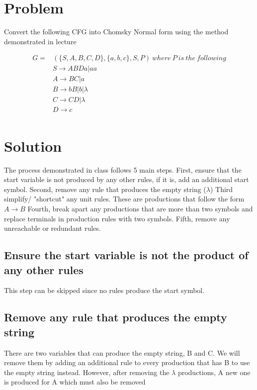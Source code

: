 \documentclass{assignment-x}
\begin{document}
\maketitle
\pagebreak

\section{Problem}
Convert the following CFG into Chomsky Normal form using the method demonstrated in lecture

\begin{align*}
    G=&(\{S,A,B,C,D\},\{a,b,c\}, S, P)\ where\ P\ is\ the\ following\\
    &S \rightarrow ABDa|aa\\
    &A \rightarrow BC|a\\
    &B \rightarrow bB|b|\lambda\\
    &C \rightarrow CD|\lambda\\
    &D \rightarrow c\\
\end{align*}

\section{Solution}
The process demonstrated in class follows 5 main steps. 
First, ensure that the start variable is not produced by any other rules, if it is, add an additional start symbol.
Second, remove any rule that produces the empty string ($\lambda$)
Third simplify/ "shortcut" any unit rules.
These are productions that follow the form $A \rightarrow B$
Fourth, break apart any productions that are more than two symbols and replace terminals in production rules with two symbols.
Fifth, remove any unreachable or redundant rules.

\subsection{Ensure the start variable is not the product of any other rules}
This step can be skipped since no rules produce the start symbol.

\subsection{Remove any rule that produces the empty string}
There are two variables that can produce the empty string, B and C.
We will remove them by adding an additional rule to every production that has B to use the empty string instead.
However, after removing the $\lambda$ productions, A new one is produced for A which must also be removed
\end{document}
